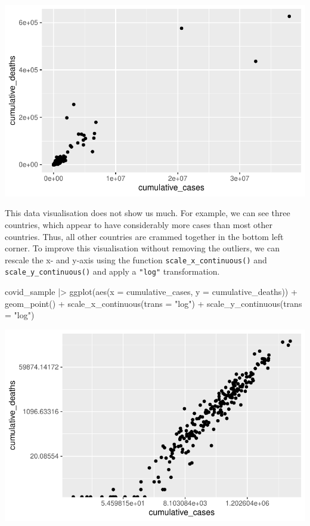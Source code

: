 \documentclass[
  letterpaper,
]{krantz}
\makeatletter
\newenvironment{Shaded}{\begin{snugshade}}{\end{snugshade}}
\newcommand{\AttributeTok}[1]{\textcolor[rgb]{0.40,0.45,0.13}{#1}}
\newcommand{\FunctionTok}[1]{\textcolor[rgb]{0.28,0.35,0.67}{#1}}
\newcommand{\NormalTok}[1]{\textcolor[rgb]{0.00,0.23,0.31}{#1}}
\newcommand{\SpecialCharTok}[1]{\textcolor[rgb]{0.37,0.37,0.37}{#1}}
\newcommand{\StringTok}[1]{\textcolor[rgb]{0.13,0.47,0.30}{#1}}
\newenvironment{kframe}{%
\medskip{}
\setlength{\fboxsep}{.8em}
 \def\at@end@of@kframe{}%
 \ifinner\ifhmode%
  \def\at@end@of@kframe{\end{minipage}}%
  \begin{minipage}{\columnwidth}%
 \fi\fi%
 \def\FrameCommand##1{\hskip\@totalleftmargin \hskip-\fboxsep
 \colorbox{shadecolor}{##1}\hskip-\fboxsep
     \hskip-\linewidth \hskip-\@totalleftmargin \hskip\columnwidth}%
 \MakeFramed {\advance\hsize-\width
   \@totalleftmargin\z@ \linewidth\hsize
   \@setminipage}}%
 {\par\unskip\endMakeFramed%
 \at@end@of@kframe}
\renewenvironment{Shaded}{\begin{kframe}}{\end{kframe}}
\makeatother
\begin{document}
\includegraphics{13_regressions_files/figure-pdf/fitting-model-by-hand-step-one-1.pdf}

This data visualisation does not show us much. For example, we can see
three countries, which appear to have considerably more cases than most
other countries. Thus, all other countries are crammed together in the
bottom left corner. To improve this visualisation without removing the
outliers, we can rescale the x- and y-axis using the function
\texttt{scale\_x\_continuous()} and \texttt{scale\_y\_continuous()} and
apply a \texttt{"log"} transformation.

\begin{Shaded}
\begin{Highlighting}[]
\NormalTok{covid\_sample }\SpecialCharTok{|\textgreater{}}
  \FunctionTok{ggplot}\NormalTok{(}\FunctionTok{aes}\NormalTok{(}\AttributeTok{x =}\NormalTok{ cumulative\_cases,}
             \AttributeTok{y =}\NormalTok{ cumulative\_deaths)) }\SpecialCharTok{+}
  \FunctionTok{geom\_point}\NormalTok{() }\SpecialCharTok{+}
  \FunctionTok{scale\_x\_continuous}\NormalTok{(}\AttributeTok{trans =} \StringTok{"log"}\NormalTok{) }\SpecialCharTok{+}
  \FunctionTok{scale\_y\_continuous}\NormalTok{(}\AttributeTok{trans =} \StringTok{"log"}\NormalTok{)}
\end{Highlighting}
\end{Shaded}

\includegraphics{13_regressions_files/figure-pdf/fitting-model-by-hand-step-two-1.pdf}
\end{document}

